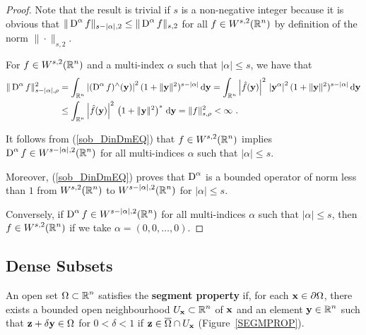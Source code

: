 \begin{proof}
Note that the result is trivial if $s$ is a non-negative integer
because it is obvious that
$\displaystyle \|\operatorname{D}^\alpha f\|_{s-|\alpha|,2} \leq
\|\operatorname{D}^\alpha f\|_{s,2}$ for all $\displaystyle f \in W^{s,2}(\mathbb{R}^n)$
by definition of the norm $\|\cdot\|_{s,2}$.

For $\displaystyle f \in W^{s,2}(\mathbb{R}^n)$ and a multi-index $\alpha$
such that $|\alpha| \leq s$, we have that
\begin{align}
\|\operatorname{D}^\alpha f\|_{s-|\alpha|,\rho}^2 &= \int_{\mathbb{R}^n}
\left| (\operatorname{D}^\alpha f)^\wedge(\mathbf{y}) \right|^2
(1+\|\mathbf{y}\|^2)^{s-|\alpha|} \,\mathrm{d}{\mathbf{y}}
= \int_{\mathbb{R}^n}
\left|\hat{f}(\mathbf{y}) \right|^2 \, \left| \mathbf{y}^\alpha \right|^2
(1+\|\mathbf{y}\|^2)^{s-|\alpha|} \,\mathrm{d}{\mathbf{y}} \nonumber \\
&\leq \int_{\mathbb{R}^n} \left|\hat{f}(\mathbf{y}) \right|^2 \,
\left( 1 + \|\mathbf{y}\|^2\right)^s \,\mathrm{d}{\mathbf{y}} = \|f\|_{s,\rho}^2
< \infty \ . \label{sob_DinDmEQ}
\end{align}

It follows from (\ref{sob_DinDmEQ}) that
$\displaystyle f\in W^{s,2}(\mathbb{R}^n)$ implies
$\displaystyle \operatorname{D}^\alpha f \in W^{s-|\alpha|,2}(\mathbb{R}^n)$
for all multi-indices $\alpha$ such that $|\alpha|\leq s$.

Moreover, (\ref{sob_DinDmEQ}) proves that
$\displaystyle \operatorname{D}^\alpha$ is a bounded operator
of norm less than $1$ from $\displaystyle W^{s,2}(\mathbb{R}^n)$ to
$\displaystyle W^{s-|\alpha|,2}(\mathbb{R}^n)$ for $|\alpha|\leq s$.

Conversely, if $\displaystyle \operatorname{D}^\alpha f \in W^{s-|\alpha|,2}(\mathbb{R}^n)$ for
all multi-indices $\alpha$ such that $|\alpha|\leq s$, then
$\displaystyle f\in W^{s,2}(\mathbb{R}^n)$ if we take $\alpha = (0,0,\ldots,0)$.
\end{proof}

\subsection{Dense Subsets}

\begin{defn}
An open set $\displaystyle \Omega \subset \mathbb{R}^n$ satisfies
the {\bfseries segment property} if, for each
$\mathbf{x} \in \partial \Omega$,
there exists a bounded open neighbourhood
$\displaystyle U_{\mathbf{x}} \subset \mathbb{R}^n$ of $\mathbf{x}$ and an
element $\displaystyle \mathbf{y} \in \mathbb{R}^n$ such that
$\mathbf{z} + \delta \mathbf{y} \in \Omega$ for $0<\delta < 1$ if
$\mathbf{z} \in \overline{\Omega} \cap U_{\mathbf{x}}$ (Figure~\ref{SEGMPROP}).
\end{defn}

